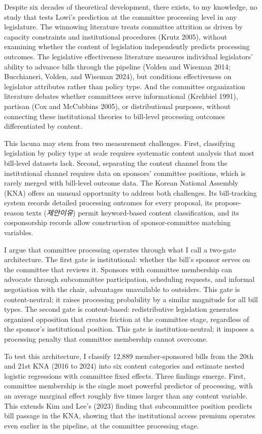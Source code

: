 \documentclass[11pt]{article}
\begin{document}
Despite six decades of theoretical development, there exists, to my knowledge, no study that tests Lowi's prediction at the committee processing level in any legislature. The winnowing literature treats committee attrition as driven by capacity constraints and institutional procedures (Krutz 2005), without examining whether the content of legislation independently predicts processing outcomes. The legislative effectiveness literature measures individual legislators' ability to advance bills through the pipeline (Volden and Wiseman 2014; Bucchianeri, Volden, and Wiseman 2024), but conditions effectiveness on legislator attributes rather than policy type. And the committee organization literature debates whether committees serve informational (Krehbiel 1991), partisan (Cox and McCubbins 2005), or distributional purposes, without connecting these institutional theories to bill-level processing outcomes differentiated by content.

This lacuna may stem from two measurement challenges. First, classifying legislation by policy type at scale requires systematic content analysis that most bill-level datasets lack. Second, separating the content channel from the institutional channel requires data on sponsors' committee positions, which is rarely merged with bill-level outcome data. The Korean National Assembly (KNA) offers an unusual opportunity to address both challenges. Its bill-tracking system records detailed processing outcomes for every proposal, its propose-reason texts (\emph{제안이유}) permit keyword-based content classification, and its cosponsorship records allow construction of sponsor-committee matching variables.

I argue that committee processing operates through what I call a two-gate architecture. The first gate is institutional: whether the bill's sponsor serves on the committee that reviews it. Sponsors with committee membership can advocate through subcommittee participation, scheduling requests, and informal negotiation with the chair, advantages unavailable to outsiders. This gate is content-neutral; it raises processing probability by a similar magnitude for all bill types. The second gate is content-based: redistributive legislation generates organized opposition that creates friction at the committee stage, regardless of the sponsor's institutional position. This gate is institution-neutral; it imposes a processing penalty that committee membership cannot overcome.

To test this architecture, I classify 12,889 member-sponsored bills from the 20th and 21st KNA (2016 to 2024) into six content categories and estimate nested logistic regressions with committee fixed effects. Three findings emerge. First, committee membership is the single most powerful predictor of processing, with an average marginal effect roughly five times larger than any content variable. This extends Kim and Lee's (2023) finding that subcommittee position predicts bill passage in the KNA, showing that the institutional access premium operates even earlier in the pipeline, at the committee processing stage.
\end{document}
